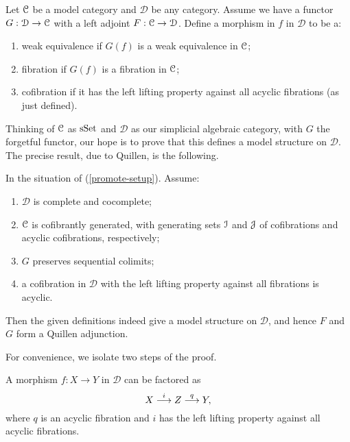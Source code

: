 \renewcommand{\D}{\mathcal{D}}

\begin{nothing}
  \label{promote-setup}
  Let $\mathcal{C}$ be a model category and $\D$ be any category. Assume we
  have a functor $G : \D \to \C$ with a left adjoint $F : \C \to
  \D$. Define a morphism in $f$ in $\D$ to be a:
  \begin{enumerate}
  \item weak equivalence if $G(f)$ is a weak equivalence in $\mathcal{C}$;
  \item fibration if $G(f)$ is a fibration in $\mathcal{C}$;
  \item cofibration if it has the left lifting property against all
    acyclic fibrations (as just defined).
  \end{enumerate}
  Thinking of $\mathcal{C}$ as $\mathrm{s}\mathrm{Set}$ and $\D$ as our simplicial algebraic
  category, with $G$ the forgetful functor, our hope is to prove that
  this defines a model structure on $\D$. The precise result, due to
  Quillen, is the following.
\end{nothing}

\begin{theorem}
  \label{promote-thm}
  In the situation of (\ref{promote-setup}). Assume:
  \begin{enumerate}
  \item $\D$ is complete and cocomplete;
  \item $\mathcal{C}$ is cofibrantly generated, with generating sets $\mathcal{I}$ and
    $\mathcal{J}$ of cofibrations and acyclic cofibrations, respectively;
  \item \label{seqcolim} $G$ preserves sequential colimits;
  \item \label{accof} a cofibration in $\D$ with the left lifting
    property against all fibrations is acyclic.
  \end{enumerate}
  Then the given definitions indeed give a model structure on $\D$,
  and hence $F$ and $G$ form a Quillen adjunction.
\end{theorem}

For convenience, we isolate two steps of the proof.

\begin{lemma}
  \label{factor1}
  A morphism $f : X \to Y$ in $\D$ can be factored as
  \[
  X \overset{i}{\longrightarrow} Z \overset{q}{\longrightarrow} Y,
  \]
  where $q$ is an acyclic fibration and $i$ has the left lifting
  property against all acyclic fibrations.
\end{lemma}

